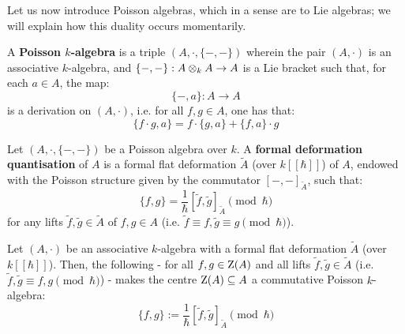             Let us now introduce Poisson algebras, which in a sense are  to Lie algebras; we will explain how this duality occurs momentarily. 
            \begin{definition} \label{def: poisson_algebras}
                A \textbf{Poisson $k$-algebra} is a triple $(A, \cdot, \{-, -\})$ wherein the pair $(A, \cdot)$ is an associative $k$-algebra, and $\{-, -\}: A \tensor_k A \to A$ is a Lie bracket such that, for each $a \in A$, the map:
                    $$\{-, a\}: A \to A$$
                is a derivation on $(A, \cdot)$, i.e. for all $f, g \in A$, one has that:
                    $$\{f \cdot g, a\} = f \cdot \{g, a\} + \{f, a\} \cdot g$$
            \end{definition}
            \begin{definition} \label{def: deformation_quantisation}
                Let $(A, \cdot, \{-, -\})$ be a Poisson algebra over $k$. A \textbf{formal deformation quantisation} of $A$ is a formal flat deformation $\tilde{A}$ (over $k[\![\hbar]\!]$) of $A$, endowed with the Poisson structure given by the commutator $[-, -]_{\tilde{A}}$, such that:
                    $$\{f, g\} = \frac{1}{\hbar}[\tilde{f}, \tilde{g}]_{\tilde{A}} \pmod{\hbar}$$
                for any lifts $\tilde{f}, \tilde{g} \in \tilde{A}$ of $f, g \in A$ (i.e. $\tilde{f} \equiv f, \tilde{g} \equiv g \pmod{\hbar}$).
            \end{definition}
            \begin{lemma} \label{lemma: poisson_brackets_from_formal_flat_deformations_of_commutative_algebras}
                Let $(A, \cdot)$ be an associative $k$-algebra with a formal flat deformation $\tilde{A}$ (over $k[\![\hbar]\!]$). Then, the following - for all $f, g \in \mathrm{Z}(A)$ and all lifts $\tilde{f}, \tilde{g} \in \tilde{A}$ (i.e. $\tilde{f}, \tilde{g} \equiv f, g \pmod{\hbar}$) - makes the centre $\mathrm{Z}(A) \subseteq A$ a commutative Poisson $k$-algebra:
                    $$\{f, g\} := \frac{1}{\hbar}[\tilde{f}, \tilde{g}]_{\tilde{A}} \pmod{\hbar}$$
            \end{lemma}
